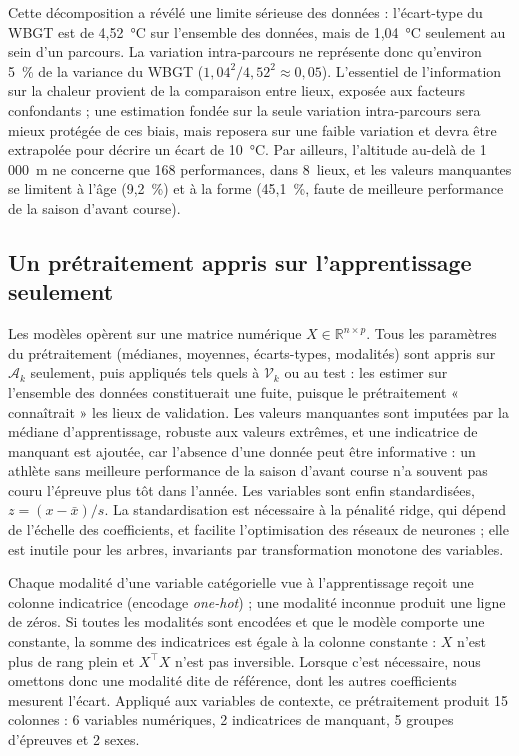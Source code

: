 \documentclass[11pt,a4paper]{article}
\begin{document}
Cette décomposition a révélé une limite sérieuse des données : l'écart-type du WBGT est de 4,52~°C sur l'ensemble des
données, mais de 1,04~°C seulement au sein d'un parcours. La variation intra-parcours ne représente donc qu'environ
5~\% de la variance du WBGT ($1{,}04^2/4{,}52^2 \approx 0{,}05$). L'essentiel de l'information sur la chaleur provient
de la comparaison entre lieux, exposée aux facteurs confondants ; une estimation fondée sur la seule variation
intra-parcours sera mieux protégée de ces biais, mais reposera sur une faible variation et devra être extrapolée pour
décrire un écart de 10~°C. Par ailleurs, l'altitude au-delà de 1\,000~m ne concerne que 168 performances, dans
8~lieux, et les valeurs manquantes se limitent à l'âge (9,2~\%) et à la forme (45,1~\%, faute de meilleure performance
de la saison d'avant course).

\subsection{Un prétraitement appris sur l'apprentissage seulement}\label{sec:pretraitement}

Les modèles opèrent sur une matrice numérique $X \in \mathbb{R}^{n \times p}$. Tous les paramètres du prétraitement
(médianes, moyennes, écarts-types, modalités) sont appris sur $\mathcal{A}_k$ seulement, puis appliqués tels quels à
$\mathcal{V}_k$ ou au test : les estimer sur l'ensemble des données constituerait une fuite, puisque le prétraitement
« connaîtrait » les lieux de validation. Les valeurs manquantes sont imputées par la médiane d'apprentissage, robuste
aux valeurs extrêmes, et une indicatrice de manquant est ajoutée, car l'absence d'une donnée peut être informative : un
athlète sans meilleure performance de la saison d'avant course n'a souvent pas couru l'épreuve plus tôt dans l'année.
Les variables sont enfin standardisées, $z = (x - \bar x)/s$. La standardisation est nécessaire à la pénalité ridge,
qui dépend de l'échelle des coefficients, et facilite l'optimisation des réseaux de neurones ; elle est inutile pour
les arbres, invariants par transformation monotone des variables.

Chaque modalité d'une variable catégorielle vue à l'apprentissage reçoit une colonne indicatrice (encodage
\emph{one-hot}) ; une modalité inconnue produit une ligne de zéros. Si toutes les modalités sont encodées et que le
modèle comporte une constante, la somme des indicatrices est égale à la colonne constante : $X$ n'est plus de rang
plein et $X^\top X$ n'est pas inversible. Lorsque c'est nécessaire, nous omettons donc une modalité dite de
référence, dont les autres coefficients mesurent l'écart. Appliqué aux variables de contexte, ce prétraitement produit
15 colonnes : 6 variables numériques, 2 indicatrices de manquant, 5 groupes d'épreuves et 2 sexes.
\end{document}
